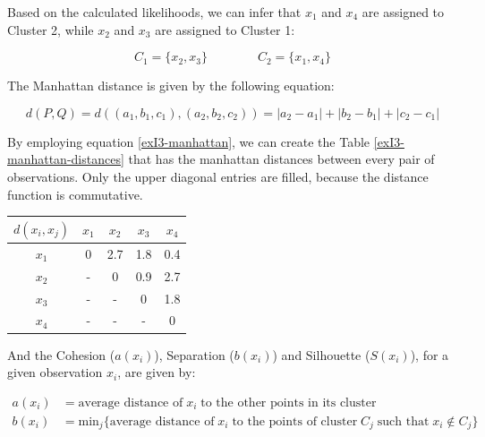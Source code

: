 \documentclass[12pt]{article}
\begin{document}
\begin{enumerate}[leftmargin=\labelsep]
          Based on the calculated likelihoods, we can infer that $x_1$ and $x_4$ are assigned to Cluster 2, while $x_2$ and $x_3$ are assigned to Cluster 1:

          \vskip -0.3cm
          \begin{equation*}
              C_1 = \{x_2, x_3\} \qquad\qquad C_2 = \{x_1, x_4\}
          \end{equation*}

          The Manhattan distance is given by the following equation:

          \begin{equation}\label{exI3-manhattan}
              d(P, Q) = d((a_1, b_1, c_1), (a_2, b_2, c_2))= |a_2 - a_1| + |b_2 - b_1| + |c_2 - c_1|
          \end{equation}

          By employing equation \eqref{exI3-manhattan}, we can create the Table \ref{exI3-manhattan-distances} that has the manhattan
          distances between every pair of observations. Only the upper diagonal entries are filled, because the distance function is commutative.

          \begin{center}
              \captionsetup{type=table}
              \begin{tabular}{c|cccc}
                  $d(x_i, x_j)$ & $x_1$ & $x_2$ & $x_3$ & $x_4$ \\
                  \hline
                  $x_1$ & 0 & 2.7 & 1.8 & 0.4 \\
                  $x_2$ & - & 0   & 0.9 & 2.7 \\
                  $x_3$ & - & -   & 0   & 1.8 \\
                  $x_4$ & - & -   & -   & 0
              \end{tabular}
              \label{exI3-manhattan-distances}
          \end{center}

          And the Cohesion ($a(x_i)$), Separation ($b(x_i)$) and Silhouette ($S(x_i)$), for a given observation $x_i$, are given by:

          \vskip -0.3cm
          \begin{equation*}
          \begin{aligned}
              a(x_i) & = \text{average distance of} \; x_i \; \text{to the other points in its cluster} \\
              b(x_i) & = \text{min}_j\{\text{average distance of} \; x_i \; \text{to the points of cluster} \; C_j \; \text{such that} \; x_i \notin C_j\}
          \end{aligned}
          \end{equation*}


\end{enumerate}
\end{document}
